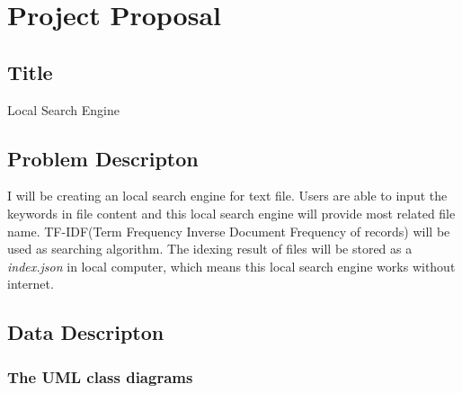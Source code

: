 \documentclass{article}
\begin{document}
\section*{Project Proposal}

\subsection*{Title}

Local Search Engine

\subsection*{Problem Descripton}

I will be creating an local search engine for text file. Users are able to input the keywords in file content and this local search engine will provide most related file name. 
TF-IDF(Term Frequency Inverse Document Frequency of records) will be used as searching algorithm. The idexing result of files will be stored as a \textit{index.json} in local computer, which means
this local search engine works without internet.

\subsection*{Data Descripton}

\subsubsection*{The UML class diagrams}

\end{document}
